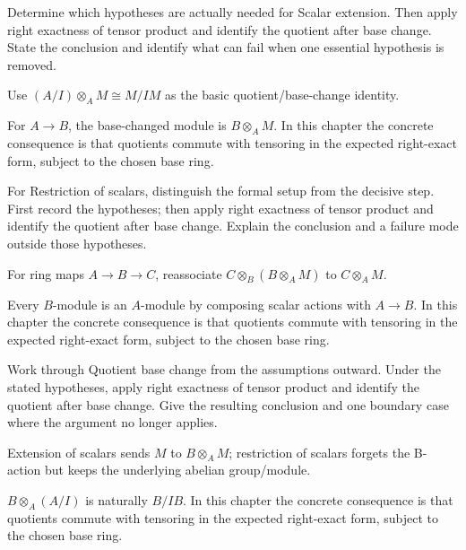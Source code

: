 \begin{exercise}\label{exr:v11-01}
Determine which hypotheses are actually needed for Scalar extension. Then apply right exactness of tensor product and identify the quotient after base change. State the conclusion and identify what can fail when one essential hypothesis is removed.
\end{exercise}
\begin{hint}
Use \((A/I)\otimes_A M\cong M/IM\) as the basic quotient/base-change identity.
\end{hint}
\begin{solution}
For $A\to B$, the base-changed module is $B\otimes_A M$. In this chapter the concrete consequence is that quotients commute with tensoring in the expected right-exact form, subject to the chosen base ring.
\end{solution}

\begin{exercise}\label{exr:v11-02}
For Restriction of scalars, distinguish the formal setup from the decisive step. First record the hypotheses; then apply right exactness of tensor product and identify the quotient after base change. Explain the conclusion and a failure mode outside those hypotheses.
\end{exercise}
\begin{hint}
For ring maps \(A\to B\to C\), reassociate \(C\otimes_B(B\otimes_A M)\) to \(C\otimes_A M\).
\end{hint}
\begin{solution}
Every $B$-module is an $A$-module by composing scalar actions with $A\to B$. In this chapter the concrete consequence is that quotients commute with tensoring in the expected right-exact form, subject to the chosen base ring.
\end{solution}

\begin{exercise}\label{exr:v11-03}
Work through Quotient base change from the assumptions outward. Under the stated hypotheses, apply right exactness of tensor product and identify the quotient after base change. Give the resulting conclusion and one boundary case where the argument no longer applies.
\end{exercise}
\begin{hint}
Extension of scalars sends \(M\) to \(B\otimes_A M\); restriction of scalars forgets the B-action but keeps the underlying abelian group/module.
\end{hint}
\begin{solution}
$B\otimes_A(A/I)$ is naturally $B/IB$. In this chapter the concrete consequence is that quotients commute with tensoring in the expected right-exact form, subject to the chosen base ring.
\end{solution}

